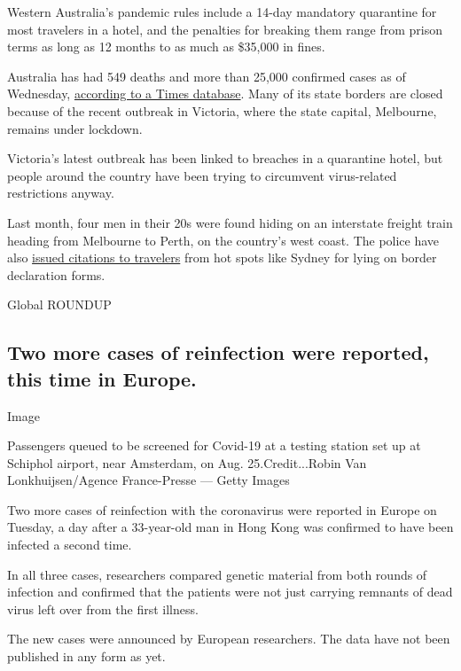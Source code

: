 Western Australia's pandemic rules include a 14-day mandatory quarantine
for most travelers in a hotel, and the penalties for breaking them range
from prison terms as long as 12 months to as much as \$35,000 in fines.

Australia has had 549 deaths and more than 25,000 confirmed cases as of
Wednesday,
\href{https://www.nytimes3xbfgragh.onion/interactive/2020/world/coronavirus-maps.html\#countries}{according
to a Times database}. Many of its state borders are closed because of
the recent outbreak in Victoria, where the state capital, Melbourne,
remains under lockdown.

Victoria's latest outbreak has been linked to breaches in a quarantine
hotel, but people around the country have been trying to circumvent
virus-related restrictions anyway.

Last month, four men in their 20s were found hiding on an interstate
freight train heading from Melbourne to Perth, on the country's west
coast. The police have also
\href{https://www.abc.net.au/news/2020-08-11/coronavirus-queensland-border-bubble-nsw-concerns/12541762}{issued
citations to travelers} from hot spots like Sydney for lying on border
declaration forms.

Global ROUNDUP

\hypertarget{two-more-cases-of-reinfection-were-reported-this-time-in-europe}{%
\subsection{Two more cases of reinfection were reported, this time in
Europe.}\label{two-more-cases-of-reinfection-were-reported-this-time-in-europe}}

Image

Passengers queued to be screened for Covid-19 at a testing station set
up at Schiphol airport, near Amsterdam, on Aug. 25.Credit...Robin Van
Lonkhuijsen/Agence France-Presse --- Getty Images

Two more cases of reinfection with the coronavirus were reported in
Europe on Tuesday, a day after a 33-year-old man in Hong Kong was
confirmed to have been infected a second time.

In all three cases, researchers compared genetic material from both
rounds of infection and confirmed that the patients were not just
carrying remnants of dead virus left over from the first illness.

The new cases were announced by European researchers. The data have not
been published in any form as yet.

